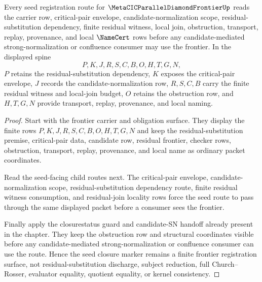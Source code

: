 \begin{theorem}
\label{thm:metacic-parallel-diamond-frontier-seed-closure-marker}
Every seed registration route for $\MetaCICParallelDiamondFrontierUp$ reads the carrier row, critical-pair envelope, candidate-normalization scope, residual-substitution dependency, finite residual witness, local join, obstruction, transport, replay, provenance, and local $\NameCert$ rows before any candidate-mediated strong-normalization or confluence consumer may use the frontier. In the displayed spine
$$
P,K,J,R,S,C,B,O,H,T,G,N,
$$
$P$ retains the residual-substitution dependency, $K$ exposes the critical-pair envelope, $J$ records the candidate-normalization row, $R,S,C,B$ carry the finite residual witness and local-join budget, $O$ retains the obstruction row, and $H,T,G,N$ provide transport, replay, provenance, and local naming.
\end{theorem}
\begin{proof}
Start with the frontier carrier and obligation surface. They display the finite rows $P,K,J,R,S,C,B,O,H,T,G,N$ and keep the residual-substitution premise, critical-pair data, candidate row, residual frontier, checker rows, obstruction, transport, replay, provenance, and local name as ordinary packet coordinates.

Read the seed-facing child routes next. The critical-pair envelope, candidate-normalization scope, residual-substitution dependency route, finite residual witness consumption, and residual-join locality rows force the seed route to pass through the same displayed packet before a consumer sees the frontier.

Finally apply the closurestatus guard and candidate-SN handoff already present in the chapter. They keep the obstruction row and structural coordinates visible before any candidate-mediated strong-normalization or confluence consumer can use the route. Hence the seed closure marker remains a finite frontier registration surface, not residual-substitution discharge, subject reduction, full Church--Rosser, evaluator equality, quotient equality, or kernel consistency.
\end{proof}
